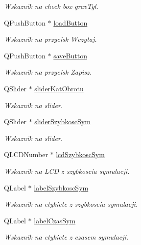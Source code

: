 \begin{DoxyCompactItemize}
\begin{DoxyCompactList}\small\item\em Wskaznik na check box grav\+Tgl. \end{DoxyCompactList}\item 
Q\+Push\+Button $\ast$ \hyperlink{class_okno_glowne_accbadc3bc4d418cfe1bce2be61881917}{load\+Button}
\begin{DoxyCompactList}\small\item\em Wskaznik na przycisk Wczytaj. \end{DoxyCompactList}\item 
Q\+Push\+Button $\ast$ \hyperlink{class_okno_glowne_a81e6650fa592f04bf0adc3bebd3346d6}{save\+Button}
\begin{DoxyCompactList}\small\item\em Wskaznik na przycisk Zapisz. \end{DoxyCompactList}\item 
Q\+Slider $\ast$ \hyperlink{class_okno_glowne_aaee43ea7074cff126b069c60657d698d}{slider\+Kat\+Obrotu}
\begin{DoxyCompactList}\small\item\em Wskaznik na slider. \end{DoxyCompactList}\item 
Q\+Slider $\ast$ \hyperlink{class_okno_glowne_a85328893065393400d5a0344004ca78b}{slider\+Szybkosc\+Sym}
\begin{DoxyCompactList}\small\item\em Wskaznik na slider. \end{DoxyCompactList}\item 
Q\+L\+C\+D\+Number $\ast$ \hyperlink{class_okno_glowne_ab100c00d4ba33d896fd0985ac366296a}{lcd\+Szybkosc\+Sym}
\begin{DoxyCompactList}\small\item\em Wskaznik na L\+C\+D z szybkoscia symulacji. \end{DoxyCompactList}\item 
Q\+Label $\ast$ \hyperlink{class_okno_glowne_ad7b0708ffdf61f3bef1349cc353a6c4e}{label\+Szybkosc\+Sym}
\begin{DoxyCompactList}\small\item\em Wskaznik na etykiete z szybkoscia symulacji. \end{DoxyCompactList}\item 
Q\+Label $\ast$ \hyperlink{class_okno_glowne_aca07e1dc5cbe30d6952f9b952073bb79}{label\+Czas\+Sym}
\begin{DoxyCompactList}\small\item\em Wskaznik na etykiete z czasem symulacji. \end{DoxyCompactList}\item 

\end{DoxyCompactItemize}
